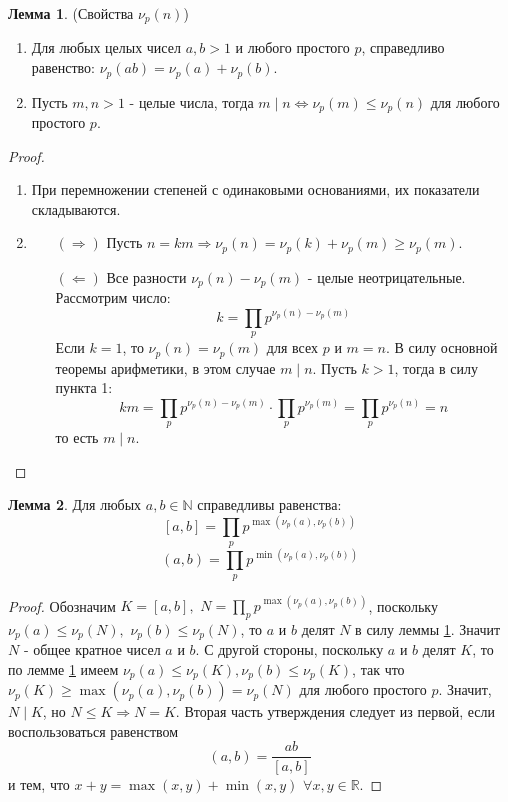 \documentclass[a4paper, 12pt]{article}
\newcommand{\R}{\mathbb{R}}
\newcommand{\N}{\mathbb{N}}
\newcommand{\lra}{\Leftrightarrow}
\renewcommand{\div}{\mid}
\newcommand\tab[1][.5cm]{\hspace*{#1}}
\theoremstyle{definition}
\newtheorem{lemma}{Лемма}[section]
\begin{document}
    \begin{lemma} (Свойства $\nu_p(n)$) \label{lemma5.3}
        \begin{enumerate}
            \item Для любых целых чисел $a,b>1$ и любого простого $p$, справедливо равенство: $\nu_p(ab)=\nu_p(a)+\nu_p(b)$.
            \item Пусть $m,n>1$ - целые числа, тогда $m \div n \lra \nu_p(m)\leq \nu_p(n)$ для любого простого $p$.
        \end{enumerate}
    \end{lemma}
    \begin{proof} \tab
        \begin{enumerate}
            \item При перемножении степеней с одинаковыми основаниями, их показатели складываются.
            \item    
            \begin{itemize}
                \item[$(\Rightarrow)$] Пусть $n=km \Rightarrow \nu_p(n)=\nu_p(k)+\nu_p(m)\geq \nu_p(m)$.
                \item[$(\Leftarrow)$] Все разности $\nu_p(n)-\nu_p(m)$ - целые неотрицательные. Рассмотрим число:
                $$k = \prod\limits_pp^{\nu_p(n)-\nu_p(m)}$$ 
                Если $k=1$, то $\nu_p(n)=\nu_p(m)$ для всех $p$ и $m=n$. В силу основной теоремы арифметики, в этом случае $m \div n$. Пусть $k>1$, тогда в силу пункта 1:
                $$km=\prod\limits_pp^{\nu_p(n)-\nu_p(m)}\cdot \prod\limits_pp^{\nu_p(m)}=\prod\limits_pp^{\nu_p(n)}=n$$
                то есть $m \div n$. 
            \end{itemize}
        \end{enumerate}
    \end{proof}
    \begin{lemma}
        Для любых $a,b\in \N$ справедливы равенства:
        $$[a,b]=\prod\limits_pp^{\max(\nu_p(a),\nu_p(b))}$$
        $$(a,b)=\prod\limits_pp^{\min(\nu_p(a),\nu_p(b))}$$
    \end{lemma}
    \begin{proof}
        Обозначим $K=[a,b],$ $N=\prod\limits_pp^{\max(\nu_p(a),\nu_p(b))}$, поскольку\\ $\nu_p(a)\leq \nu_p(N),$ $\nu_p(b)\leq \nu_p(N)$, то $a$ и $b$ делят $N$ в силу леммы \ref{lemma5.3}. Значит $N$ - общее кратное чисел $a$ и $b$. С другой стороны, поскольку $a$ и $b$ делят $K$, то по лемме \ref{lemma5.3} имеем $\nu_p(a)\leq \nu_p(K),\nu_p(b)\leq \nu_p(K)$, так что $\nu_p(K)\geq \max(\nu_p(a), \nu_p(b))=\nu_p(N)$ для любого простого $p$. Значит, $N\div K$, но $N\leq K \Rightarrow N=K$. Вторая часть утверждения следует из первой, если воспользоваться равенством
        $$(a,b)=\frac{ab}{[a,b]}$$
        и тем, что $x+y=\max(x,y)+\min(x,y)$ $\forall x,y\in \R$.
    \end{proof}
\end{document}
